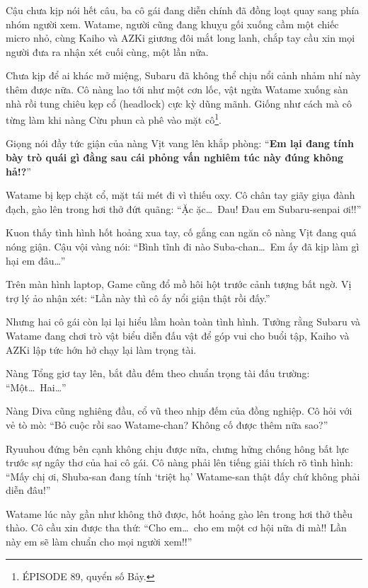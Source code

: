 \documentclass[../main.tex]{subfiles}
\begin{document}
Cậu chưa kịp nói hết câu, ba cô gái đang diễn chính đã đồng loạt quay sang phía nhóm người xem. Watame, người cũng đang khuỵu gối xuống cầm một chiếc micro nhỏ, cùng Kaiho và AZKi giương đôi mắt long lanh, chắp tay cầu xin mọi người đưa ra nhận xét cuối cùng, một lần nữa.


Chưa kịp để ai khác mở miệng, Subaru đã không thể chịu nổi cảnh nhảm nhí này thêm được nữa. Cô nàng lao tới như một cơn lốc, vật ngửa Watame xuống sàn nhà rồi tung chiêu kẹp cổ (headlock) cực kỳ dũng mãnh. Giống như cách mà cô từng làm khi nàng Cừu phun cà phê vào mặt cô\footnote{{\flaregothic ÉPISODE 89}, quyển số Bảy.}.

Giọng nói đầy tức giận của nàng Vịt vang lên khắp phòng: ``\textbf{Em lại đang tính bày trò quái gì đằng sau cái phỏng vấn nghiêm túc này đúng không hả!?}''

Watame bị kẹp chặt cổ, mặt tái mét đi vì thiếu oxy. Cô chân tay giãy giụa đành đạch, gào lên trong hơi thở đứt quãng: ``Ặc ặc\dots\ Đau! Đau em Subaru-senpai ơi!!''

Kuon thấy tình hình hốt hoảng xua tay, cố gắng can ngăn cô nàng Vịt đang quá nóng giận. Cậu vội vàng nói: ``Bình tĩnh đi nào Suba-chan\dots\ Em ấy đã kịp làm gì hại em đâu\dots''

Trên màn hình laptop, Game cũng đổ mồ hôi hột trước cảnh tượng bất ngờ. Vị trợ lý ảo nhận xét: ``Lần này thì cô ấy nổi giận thật rồi đấy.''

Nhưng hai cô gái còn lại lại hiểu lầm hoàn toàn tình hình. Tưởng rằng Subaru và Watame đang chơi trò vật biểu diễn đấu vật để góp vui cho buổi tập, Kaiho và AZKi lập tức hớn hở chạy lại làm trọng tài.

Nàng Tổng giơ tay lên, bắt đầu đếm theo chuẩn trọng tài đấu trường: ``Một\dots\ Hai\dots''

Nàng Diva cũng nghiêng đầu, cổ vũ theo nhịp đếm của đồng nghiệp. Cô hỏi với vẻ tò mò: ``Bỏ cuộc rồi sao Watame-chan? Không cố được thêm nữa sao?''


Ryuuhou đứng bên cạnh không chịu được nữa, chưng hửng chống hông bất lực trước sự ngây thơ của hai cô gái. Cô nàng phải lên tiếng giải thích rõ tình hình: ``Mấy chị ơi, Shuba-san đang tính `triệt hạ' Watame-san thật đấy chứ không phải diễn đâu!''

Watame lúc này gần như không thở được, hốt hoảng gào lên trong hơi thở thều thào. Cô cầu xin được tha thứ: ``Cho em\dots\ cho em một cơ hội nữa đi mà!! Lần này em sẽ làm chuẩn cho mọi người xem!!''
\end{document}
